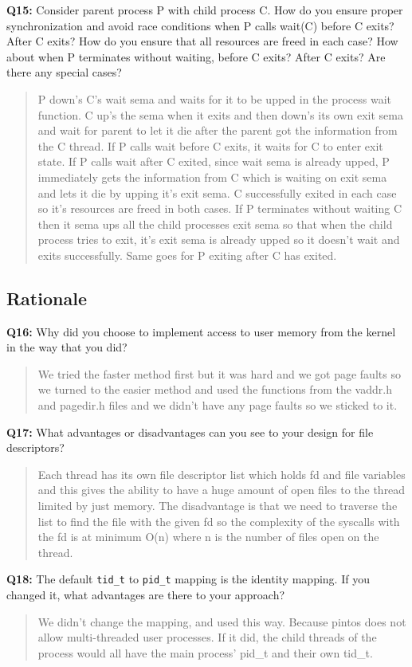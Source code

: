 \documentclass[a4paper,11pt]{paper}
\begin{document}
\textbf{Q15:} Consider parent process P with child process C.  How do you ensure proper synchronization and avoid race conditions when P calls wait(C) before C exits?  After C exits?  How do you ensure that all resources are freed in each case? How about when P terminates without waiting, before C exits?  After C exits?  Are there any special cases?
\begin{quote}
  P down's C's wait sema and waits for it to be upped in the process wait function. C up's the sema when it exits and then down's its own exit sema and wait for parent to let it die after the parent got the information from the C thread. If P calls wait before C exits, it waits for C to enter exit state. If P calls wait after C exited, since wait sema is already upped, P immediately gets the information from C which is waiting on exit sema and lets it die by upping it's exit sema. C successfully exited in each case so it's resources are freed in both cases. If P terminates without waiting C then it sema ups all the child processes exit sema so that when the child process tries to exit, it's exit sema is already upped so it doesn't wait and exits successfully. Same goes for P exiting after C has exited.
\end{quote}

\subsection{Rationale}

\textbf{Q16:} Why did you choose to implement access to user memory from the kernel in the way that you did?
\begin{quote}
  We tried the faster method first but it was hard and we got page faults  so we turned to the easier method and used the functions from the vaddr.h and pagedir.h files and we didn't have any page faults so we sticked to it.
\end{quote}

\textbf{Q17:} What advantages or disadvantages can you see to your design for file descriptors?
\begin{quote}
  Each thread has its own file descriptor list which holds fd and file variables and this gives the ability to have a huge amount of open files to the thread limited by just memory. The disadvantage is that we need to traverse the list to find the file with the given fd so the complexity of the syscalls with the fd is at minimum O(n) where n is the number of files open on the thread.
\end{quote}

\textbf{Q18:} The default \texttt{tid\_t} to \texttt{pid\_t} mapping is the identity mapping. If you changed it, what advantages are there to your approach?
\begin{quote}
  We didn't change the mapping, and used this way. Because pintos does not allow multi-threaded user processes. If it did, the child threads of the process would all have the main process' pid\_t and their own tid\_t.
\end{quote}
\end{document}
